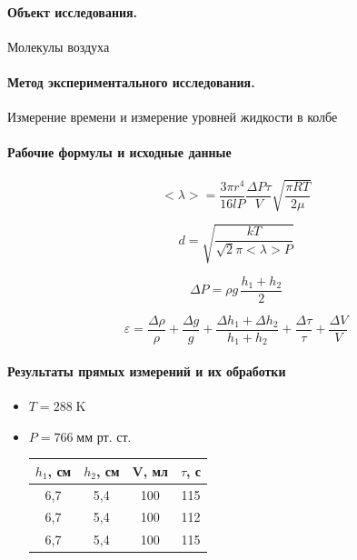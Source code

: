 \documentclass{article}
\begin{document}
\paragraph{Объект исследования.}
Молекулы воздуха

\paragraph{Метод экспериментального исследования.}
Измерение времени и измерение уровней жидкости в колбе
 \paragraph{Рабочие формулы и исходные данные}\hypertarget{formuls}{}
 \begin{equation}
 	<\lambda>=\frac{3\pi r^4}{16lP} \frac{\Delta P\tau}{V} \sqrt{\frac{\pi RT}{2\mu}}
 \end{equation}

\begin{equation}
	d=\sqrt{\frac{kT}{\sqrt{2}\pi <\lambda>P}}
\end{equation}

\begin{equation}
	\Delta P=\rho g\, \frac{h_1+h_2}{2}
\end{equation}

\begin{equation}
	\varepsilon=\frac{\Delta \rho}{\rho}+\frac{\Delta g}{g}+\frac{\Delta h_1+\Delta h_2}{h_1+h_2}+\frac{\Delta \tau}{\tau}+\frac{\Delta V}{V}
\end{equation}

\paragraph{Результаты прямых измерений и их обработки}
\begin{itemize}
	\item $T=288\;\mbox{K}$
	\item$P=766\;\mbox{мм рт. ст.}$
	\begin{table}[htb]
	\begin{tabular}{c|c|c|c}
		$h_1$,  см & $h_2$,  см & V,  мл & $\tau$,  с \\
		\hline
		6,7 & 5,4 & 100 & 115 \\
	
		6,7 & 5,4 & 100 & 112 \\
	
		6,7 & 5,4 & 100 & 115 \\
	\end{tabular}
\end{table}
\end{itemize}
\end{document}
